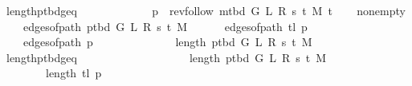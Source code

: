 \begin{isabellebody}
\ length{\isacharunderscore}{\kern0pt}p{\isacharunderscore}{\kern0pt}tbd{\isacharunderscore}{\kern0pt}geq{\isacharunderscore}{\kern0pt}{}\isanewline
\ \ \ \ \isacommand{{\isachardot}{\kern0pt}}\isamarkupfalse%
\isanewline
{}\isamarkupfalse%
\isanewline
\ \ \isamarkupfalse%
\ {}\isanewline
\ \ \isamarkupfalse%
\ {\isacharquery}{\kern0pt}p\ {\isacharequal}{\kern0pt}\ {\isachardoublequoteopen}rev{\isacharunderscore}{\kern0pt}follow\ {\isacharparenleft}{\kern0pt}m{\isacharunderscore}{\kern0pt}tbd\ G\ L\ R\ s\ t\ M{\isacharparenright}{\kern0pt}\ t{\isachardoublequoteclose}\isanewline
\ \ \isamarkupfalse%
\ non{\isacharunderscore}{\kern0pt}empty{\isacharcolon}{\kern0pt}\isanewline
\ \ \ \ {\isachardoublequoteopen}edges{\isacharunderscore}{\kern0pt}of{\isacharunderscore}{\kern0pt}path\ {\isacharparenleft}{\kern0pt}p{\isacharunderscore}{\kern0pt}tbd\ G\ L\ R\ s\ t\ M{\isacharparenright}{\kern0pt}\ {\isasymnoteq}\ {\isacharbrackleft}{\kern0pt}{\isacharbrackright}{\kern0pt}{\isachardoublequoteclose}\isanewline
\ \ \ \ {\isachardoublequoteopen}edges{\isacharunderscore}{\kern0pt}of{\isacharunderscore}{\kern0pt}path\ {\isacharparenleft}{\kern0pt}tl\ {\isacharquery}{\kern0pt}p{\isacharparenright}{\kern0pt}\ {\isasymnoteq}\ {\isacharbrackleft}{\kern0pt}{\isacharbrackright}{\kern0pt}{\isachardoublequoteclose}\isanewline
\ \ \ \ {\isachardoublequoteopen}edges{\isacharunderscore}{\kern0pt}of{\isacharunderscore}{\kern0pt}path\ {\isacharquery}{\kern0pt}p\ {\isasymnoteq}\ {\isacharbrackleft}{\kern0pt}{\isacharbrackright}{\kern0pt}{\isachardoublequoteclose}\isanewline
\ \ \isamarkupfalse%
\ {\isacharminus}{\kern0pt}\isanewline
\ \ \ \ \isamarkupfalse%
\ {\isachardoublequoteopen}{}\ {\isasymle}\ length\ {\isacharparenleft}{\kern0pt}p{\isacharunderscore}{\kern0pt}tbd\ G\ L\ R\ s\ t\ M{\isacharparenright}{\kern0pt}{\isachardoublequoteclose}\isanewline
\ \ \ \ \ \ \isamarkupfalse%
\ length{\isacharunderscore}{\kern0pt}p{\isacharunderscore}{\kern0pt}tbd{\isacharunderscore}{\kern0pt}geq{\isacharunderscore}{\kern0pt}{}\isanewline
\ \ \ \ \ \ \isacommand{{\isachardot}{\kern0pt}}\isamarkupfalse%
\isanewline
\ \ \ \ \isamarkupfalse%
\isanewline
\ \ \ \ \ \ {\isachardoublequoteopen}{}\ {\isasymle}\ length\ {\isacharparenleft}{\kern0pt}p{\isacharunderscore}{\kern0pt}tbd\ G\ L\ R\ s\ t\ M{\isacharparenright}{\kern0pt}{\isachardoublequoteclose}\isanewline
\ \ \ \ \ \ {\isachardoublequoteopen}{}\ {\isasymle}\ length\ {\isacharparenleft}{\kern0pt}tl\ {\isacharquery}{\kern0pt}p{\isacharparenright}{\kern0pt}{\isachardoublequoteclose}\isanewline

\end{isabellebody}
